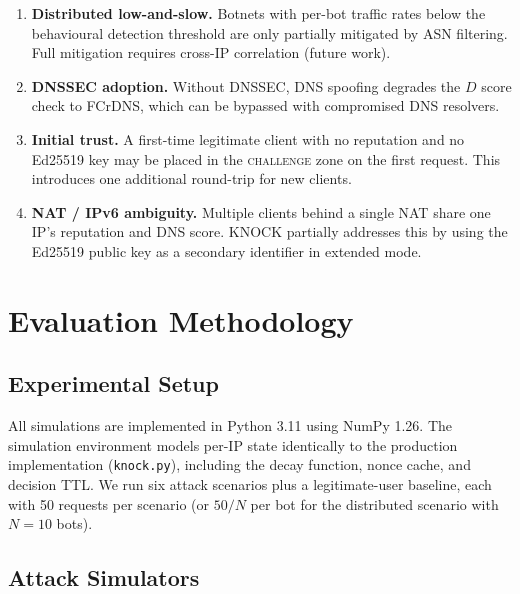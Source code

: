 \documentclass[10pt,conference]{IEEEtran}
\begin{document}
\begin{enumerate}[leftmargin=*]
  \item \textbf{Distributed low-and-slow.}  Botnets with per-bot
    traffic rates below the behavioural detection threshold are only
    partially mitigated by ASN filtering.  Full mitigation requires
    cross-IP correlation (future work).

  \item \textbf{DNSSEC adoption.}  Without DNSSEC, DNS spoofing
    degrades the $D$ score check to FCrDNS, which can be bypassed
    with compromised DNS resolvers.

  \item \textbf{Initial trust.}  A first-time legitimate client with
    no reputation and no Ed25519 key may be placed in the
    \textsc{challenge} zone on the first request.  This introduces
    one additional round-trip for new clients.

  \item \textbf{NAT / IPv6 ambiguity.}  Multiple clients behind a
    single NAT share one IP's reputation and DNS score.  KNOCK
    partially addresses this by using the Ed25519 public key as a
    secondary identifier in extended mode.
\end{enumerate}

\section{Evaluation Methodology}
\label{sec:eval}

\subsection{Experimental Setup}

All simulations are implemented in Python 3.11 using NumPy 1.26.
The simulation environment models per-IP state identically to the
production implementation (\texttt{knock.py}), including the decay
function, nonce cache, and decision TTL.  We run six attack scenarios
plus a legitimate-user baseline, each with 50 requests per scenario
(or $50/N$ per bot for the distributed scenario with $N=10$ bots).

\subsection{Attack Simulators}
\end{document}
